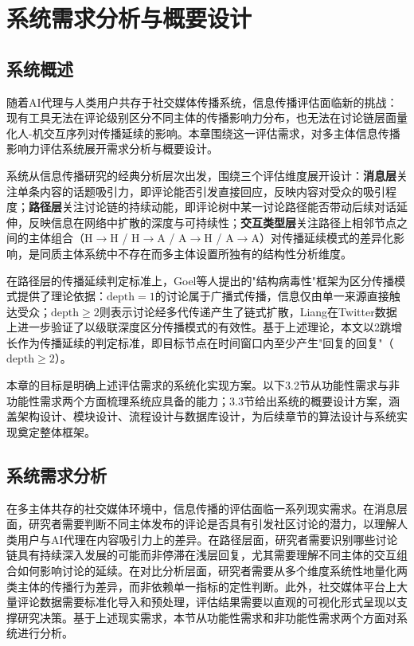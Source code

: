 \chapter{系统需求分析与概要设计}

\section{系统概述}

随着AI代理与人类用户共存于社交媒体传播系统，信息传播评估面临新的挑战：现有工具无法在评论级别区分不同主体的传播影响力分布，也无法在讨论链层面量化人-机交互序列对传播延续的影响。本章围绕这一评估需求，对多主体信息传播影响力评估系统展开需求分析与概要设计。

系统从信息传播研究的经典分析层次\cite{zhou2021survey}出发，围绕三个评估维度展开设计：\textbf{消息层}关注单条内容的话题吸引力，即评论能否引发直接回应，反映内容对受众的吸引程度；\textbf{路径层}关注讨论链的持续动能，即评论树中某一讨论路径能否带动后续对话延伸，反映信息在网络中扩散的深度与可持续性；\textbf{交互类型层}关注路径上相邻节点之间的主体组合（H$\to$H / H$\to$A / A$\to$H / A$\to$A）对传播延续模式的差异化影响，是同质主体系统中不存在而多主体设置所独有的结构性分析维度。

在路径层的传播延续判定标准上，Goel等人\cite{goel2016structural}提出的"结构病毒性"框架为区分传播模式提供了理论依据：$\text{depth}=1$的讨论属于广播式传播，信息仅由单一来源直接触达受众；$\text{depth} \geq 2$则表示讨论经多代传递产生了链式扩散\cite{zhang2020viral}，Liang\cite{liang2018broadcast}在Twitter数据上进一步验证了以级联深度区分传播模式的有效性。基于上述理论，本文以2跳增长作为传播延续的判定标准，即目标节点在时间窗口内至少产生"回复的回复"（$\text{depth} \geq 2$）。

本章的目标是明确上述评估需求的系统化实现方案。以下3.2节从功能性需求与非功能性需求两个方面梳理系统应具备的能力；3.3节给出系统的概要设计方案，涵盖架构设计、模块设计、流程设计与数据库设计，为后续章节的算法设计与系统实现奠定整体框架。

\section{系统需求分析}

在多主体共存的社交媒体环境中，信息传播的评估面临一系列现实需求。在消息层面，研究者需要判断不同主体发布的评论是否具有引发社区讨论的潜力，以理解人类用户与AI代理在内容吸引力上的差异。在路径层面，研究者需要识别哪些讨论链具有持续深入发展的可能而非停滞在浅层回复，尤其需要理解不同主体的交互组合如何影响讨论的延续。在对比分析层面，研究者需要从多个维度系统性地量化两类主体的传播行为差异，而非依赖单一指标的定性判断。此外，社交媒体平台上大量评论数据需要标准化导入和预处理，评估结果需要以直观的可视化形式呈现以支撑研究决策。基于上述现实需求，本节从功能性需求和非功能性需求两个方面对系统进行分析。

